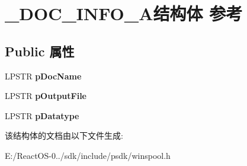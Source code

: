 \hypertarget{struct___d_o_c___i_n_f_o__1_a}{}\section{\+\_\+\+D\+O\+C\+\_\+\+I\+N\+F\+O\+\_\+A结构体 参考}
\label{struct___d_o_c___i_n_f_o__1_a}
\subsection*{Public 属性}
\begin{DoxyCompactItemize}
\item 
\mbox{\label{struct___d_o_c___i_n_f_o__1_a_a92c8a74d3f1569e726941d436d01ce6a}} 
L\+P\+S\+TR {\bfseries p\+Doc\+Name}
\item 
\mbox{\label{struct___d_o_c___i_n_f_o__1_a_a03aa20334df7df1d4b556b0e59948222}} 
L\+P\+S\+TR {\bfseries p\+Output\+File}
\item 
\mbox{\label{struct___d_o_c___i_n_f_o__1_a_a9f3179f31fe9fb5b01682c8f278ac80d}} 
L\+P\+S\+TR {\bfseries p\+Datatype}
\end{DoxyCompactItemize}


该结构体的文档由以下文件生成\+:\begin{DoxyCompactItemize}
\item 
E\+:/\+React\+O\+S-\/0../sdk/include/psdk/winspool.\+h\end{DoxyCompactItemize}
